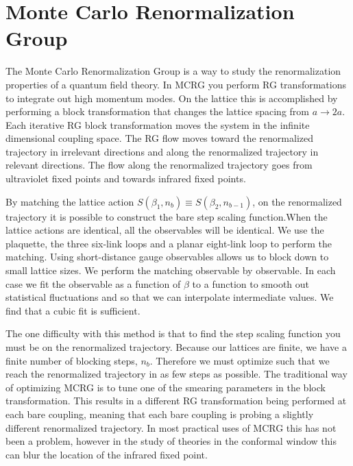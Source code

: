 \documentclass{PoS}
\newcommand{\be}{\ensuremath{\beta} }
\begin{document}
\section{\label{sec:mcrg}Monte Carlo Renormalization Group} %
The Monte Carlo Renormalization Group is a way to study the renormalization properties of a quantum field theory.
In MCRG you perform RG transformations to integrate out high momentum modes.
On the lattice this is accomplished by performing a block transformation that changes the lattice spacing from $a \to 2a$.
Each iterative RG block transformation moves the system in the infinite dimensional coupling space.
The RG flow moves toward the renormalized trajectory in irrelevant directions and along the renormalized trajectory in relevant directions.
The flow along the renormalized trajectory goes from ultraviolet fixed points and towards infrared fixed points.

By matching the lattice action $S(\beta_1, n_b) \equiv S(\beta_2, n_{b - 1})$, on the renormalized trajectory it is possible to construct the bare step scaling function.When the lattice actions are identical, all the observables will be identical.
We use the plaquette, the three six-link loops and a planar eight-link loop to perform the matching. %
Using short-distance gauge observables allows us to block down to small lattice sizes.
We perform the matching observable by observable.
In each case we fit the observable as a function of \be to a function to smooth out statistical fluctuations and so that we can interpolate intermediate values.
We find that a cubic fit is sufficient.

The one difficulty with this method is that to find the step scaling function you must be on the renormalized trajectory.
Because our lattices are finite, we have a finite number of blocking steps, $n_b$.
Therefore we must optimize such that we reach the renormalized trajectory in as few steps as possible.
The traditional way of optimizing MCRG is to tune one of the smearing parameters in the block transformation.
This results in a different RG transformation being performed at each bare coupling, meaning that each bare coupling is probing a slightly different renormalized trajectory.
In most practical uses of MCRG this has not been a problem, however in the study of theories in the conformal window this can blur the location of the infrared fixed point.
\end{document}
